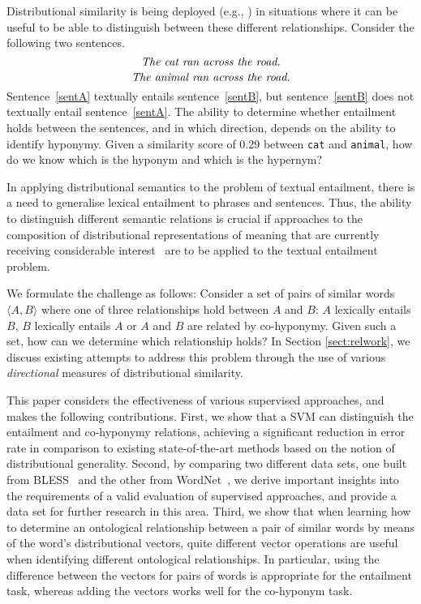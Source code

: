 \documentclass[11pt]{article}
\begin{document}
Distributional similarity is being deployed (e.g., ) in situations where it can be useful to be able to distinguish between these different relationships. Consider the following two sentences.
\begin{equation}
\label{sentA}
\mbox{\em The cat ran across the road.}
\end{equation}
\begin{equation}
\label{sentB}
\mbox{\em The animal ran across the road.}
\end{equation}
Sentence~\ref{sentA} textually entails sentence~\ref{sentB}, but sentence~\ref{sentB} does not textually entail sentence~\ref{sentA}. The ability to determine whether entailment holds between the sentences, and in which direction, depends on the ability to identify hyponymy.   Given a similarity score of 0.29 between \texttt{cat} and \texttt{animal}, how do we know which is the hyponym and which is the hypernym? 

In applying distributional semantics to the problem of textual entailment, there is a need to generalise lexical entailment to phrases and sentences. Thus, the ability to distinguish different semantic relations is crucial if approaches to the composition of distributional representations of meaning that are currently receiving considerable interest~\cite{Widdows:08,Mitchell:08,Baroni2010,Grefenstette:11,Socher:12,Weeds:14} are to be applied to the textual entailment problem.

We formulate the challenge as follows: Consider a set of pairs of similar words $\langle A,B\rangle$ where one of three relationships hold between $A$ and $B$: $A$ lexically entails $B$, $B$ lexically entails $A$ or  $A$ and $B$ are related by co-hyponymy. Given such a set, how can we determine which relationship holds? In Section \ref{sect:relwork}, we discuss existing attempts to address this problem through the use of various \emph{directional} measures of distributional similarity.  

This paper  considers the effectiveness of various supervised approaches, and makes the following contributions.  First, we show that a SVM can distinguish the entailment and co-hyponymy relations, achieving a significant reduction in error rate in comparison to  existing state-of-the-art methods based on the notion of distributional generality.  Second, by comparing two  different data sets, one built from  BLESS~\cite{Baroni2011} and the other from WordNet~\cite{Fellbaum:98}, we derive important insights into the requirements of a valid evaluation of supervised approaches, and provide a data set for further research in this area. Third, we show that when learning how to determine an ontological relationship between a pair of similar words by means of the word's distributional vectors, quite different vector operations are useful when identifying different ontological relationships. In particular, using the difference between the vectors for pairs of words is appropriate for the entailment task, whereas adding the vectors works well for the co-hyponym task.
\end{document}
